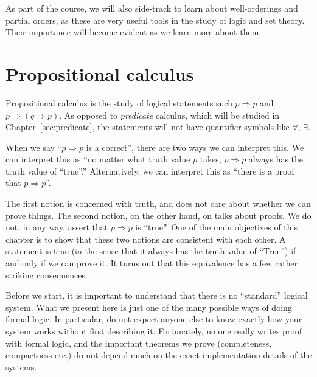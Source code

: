 \documentclass[a4paper]{article}
\begin{document}
As part of the course, we will also side-track to learn about well-orderings and partial orders, as these are very useful tools in the study of logic and set theory. Their importance will become evident as we learn more about them.

\section{Propositional calculus}
\label{sec:propositional}
Propositional calculus is the study of logical statements such $p \Rightarrow p$ and $p \Rightarrow (q\Rightarrow p)$. As opposed to \emph{predicate} calculus, which will be studied in Chapter~\ref{sec:predicate}, the statements will not have quantifier symbols like $\forall$, $\exists$.

When we say ``$p \Rightarrow p$ is a correct'', there are two ways we can interpret this. We can interpret this as ``no matter what truth value $p$ takes, $p \Rightarrow p$ always has the truth value of ``true''.'' Alternatively, we can interpret this as ``there is a proof that $p \Rightarrow p$''.

The first notion is concerned with truth, and does not care about whether we can prove things. The second notion, on the other hand, on talks about proofs. We do not, in any way, assert that $p \Rightarrow p$ is ``true''. One of the main objectives of this chapter is to show that these two notions are consistent with each other. A statement is true (in the sense that it always has the truth value of ``True'') if and only if we can prove it. It turns out that this equivalence has a few rather striking consequences.

Before we start, it is important to understand that there is no ``standard'' logical system. What we present here is just one of the many possible ways of doing formal logic. In particular, do not expect anyone else to know exactly how your system works without first describing it. Fortunately, no one really writes proof with formal logic, and the important theorems we prove (completeness, compactness etc.) do not depend much on the exact implementation details of the systems.
\end{document}
